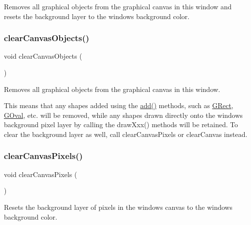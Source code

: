 Removes all graphical objects from the graphical canvas in this window and resets the background layer to the window\textquotesingle{}s background color. 

\mbox{\label{classGWindow_a7d6e3e87568ed9962d29a0c9337c4b87}} 
\subsubsection{\texorpdfstring{clear\+Canvas\+Objects()}{clearCanvasObjects()}}
{\footnotesize\ttfamily void clear\+Canvas\+Objects (\begin{DoxyParamCaption}{ }\end{DoxyParamCaption})\hspace{0.3cm}{\ttfamily [virtual]}}



Removes all graphical objects from the graphical canvas in this window. 

This means that any shapes added using the \mbox{\hyperlink{classGWindow_a6f99b7c841256dbdc5acaafbbca4e685}{add()}} methods, such as \mbox{\hyperlink{classGRect}{G\+Rect}}, \mbox{\hyperlink{classGOval}{G\+Oval}}, etc. will be removed, while any shapes drawn directly onto the window\textquotesingle{}s background pixel layer by calling the draw\+Xxx() methods will be retained. To clear the background layer as well, call clear\+Canvas\+Pixels or clear\+Canvas instead. \mbox{\label{classGWindow_a0c30950304fa997055183be1d212a262}} 
\subsubsection{\texorpdfstring{clear\+Canvas\+Pixels()}{clearCanvasPixels()}}
{\footnotesize\ttfamily void clear\+Canvas\+Pixels (\begin{DoxyParamCaption}{ }\end{DoxyParamCaption})\hspace{0.3cm}{\ttfamily [virtual]}}



Resets the background layer of pixels in the window\textquotesingle{}s canvas to the window\textquotesingle{}s background color. 

